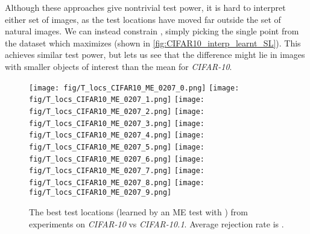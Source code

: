 \documentclass{article}
\begin{document}
Although these approaches give nontrivial test power,
it is hard to interpret either set of images,
as the test locations have moved far outside the set of natural images.
We can instead constrain ,
simply picking the single point from the dataset which maximizes 
(shown in \cref{fig:CIFAR10_interp_learnt_SL}).
This achieves similar test power,
but lets us see that the difference might lie in images with smaller objects of interest than the mean for \emph{CIFAR-10}.

\begin{figure}[!p]
    \begin{center}
        \subfigure
        {\texttt{[image: fig/T\_locs\_CIFAR10\_ME\_0207\_0.png]}}
        \subfigure
        {\texttt{[image: fig/T\_locs\_CIFAR10\_ME\_0207\_1.png]}}
        \subfigure
        {\texttt{[image: fig/T\_locs\_CIFAR10\_ME\_0207\_2.png]}}
        \subfigure
        {\texttt{[image: fig/T\_locs\_CIFAR10\_ME\_0207\_3.png]}}
        \subfigure
        {\texttt{[image: fig/T\_locs\_CIFAR10\_ME\_0207\_4.png]}}
        \subfigure
        {\texttt{[image: fig/T\_locs\_CIFAR10\_ME\_0207\_5.png]}}
        \subfigure
        {\texttt{[image: fig/T\_locs\_CIFAR10\_ME\_0207\_6.png]}}
        \subfigure
        {\texttt{[image: fig/T\_locs\_CIFAR10\_ME\_0207\_7.png]}}
        \subfigure
        {\texttt{[image: fig/T\_locs\_CIFAR10\_ME\_0207\_8.png]}}
        \subfigure
        {\texttt{[image: fig/T\_locs\_CIFAR10\_ME\_0207\_9.png]}}
        \caption{The best test locations (learned by an ME test with ) from  experiments on \emph{CIFAR-10} vs \emph{CIFAR-10.1}. Average rejection rate is .}  \label{fig:CIFAR10_interp_learnt_ME}
    \end{center}
    \vspace{-0.5cm}
\end{figure}
\end{document}
